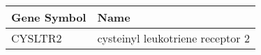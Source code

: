 \begin{tabular}{ll}
\toprule
Gene Symbol &                             Name \\
\midrule
    CYSLTR2 & cysteinyl leukotriene receptor 2 \\
\bottomrule
\end{tabular}
